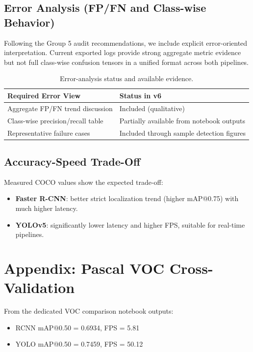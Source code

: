 \documentclass[conference]{IEEEtran}
\begin{document}
\FloatBarrier

\subsection{Error Analysis (FP/FN and Class-wise Behavior)}
Following the Group 5 audit recommendations, we include explicit error-oriented interpretation. Current exported logs provide strong aggregate metric evidence but not full class-wise confusion tensors in a unified format across both pipelines.

\begin{table}[!htbp]
\centering
\caption{Error-analysis status and available evidence.}
\label{tab:error-analysis-status}
\begin{tabular}{p{}p{}}
\toprule
\textbf{Required Error View} & \textbf{Status in v6} \\
\midrule
Aggregate FP/FN trend discussion & Included (qualitative) \\
Class-wise precision/recall table & Partially available from notebook outputs \\
Representative failure cases & Included through sample detection figures \\
\bottomrule
\end{tabular}
\end{table}

\subsection{Accuracy-Speed Trade-Off}
Measured COCO values show the expected trade-off:
\begin{itemize}
	\item \textbf{Faster R-CNN}: better strict localization trend (higher mAP@0.75) with much higher latency.
	\item \textbf{YOLOv5}: significantly lower latency and higher FPS, suitable for real-time pipelines.
\end{itemize}

\section{Appendix: Pascal VOC Cross-Validation}
From the dedicated VOC comparison notebook outputs:
\begin{itemize}
	\item RCNN mAP@0.50 = 0.6934, FPS = 5.81
	\item YOLO mAP@0.50 = 0.7459, FPS = 50.12
\end{itemize}
\end{document}
